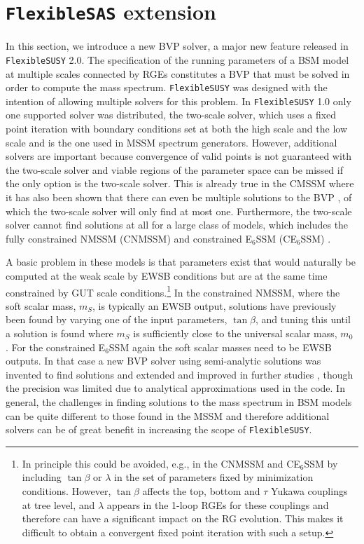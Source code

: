 \documentclass[final,3p,11pt,pdflatex]{elsarticle}
\makeatletter
\newcommand{\fs}{\texttt{FlexibleSUSY}\@\xspace}
\newcommand{\fsone}{\fs 1.0\@\xspace}
\newcommand{\fstwo}{\fs 2.0\@\xspace}
\newcommand{\fsas}{\texttt{FlexibleSAS}\@\xspace}
\newcommand{\ESSM}{E$_6$SSM\@\xspace}
\newcommand{\mzero}{\ensuremath{m_0}\xspace}
\makeatother
\begin{document}
\section{\fsas extension}
\label{sec:fsas}
In this section, we introduce a new BVP
solver, a major new feature released in \fstwo. The specification of the
running parameters of a BSM model at multiple scales connected by RGEs
constitutes a BVP that must be solved in order to compute the mass spectrum.
\fs was designed with the intention of allowing multiple solvers for this
problem. In \fsone only one supported solver was
distributed, the two-scale solver, which uses a fixed point iteration
with boundary conditions set at both the high scale and the low scale
and is the one used in MSSM spectrum generators. However, additional
solvers are important because convergence of valid points is not
guaranteed with the two-scale solver and viable regions of the
parameter space can be missed if the only option is the two-scale
solver.  This is already true in the CMSSM where it has also been
shown that there can even be multiple solutions to the BVP
\cite{Allanach:2013cda,Allanach:2013yua}, of which the two-scale solver will
only find at most one.  Furthermore, the two-scale
solver cannot find solutions at all for a large class of models, which
includes the fully constrained NMSSM (CNMSSM) \cite{Ellwanger:1993xa,
  Ellwanger:1995ru,Ellwanger:1996gw} and constrained \ESSM
(C\ESSM) \cite{Athron:2009bs}.

A basic problem in these models is that parameters exist that would
naturally be computed at the weak scale by EWSB conditions but
are at the same time constrained by GUT scale conditions.\footnote{In
  principle this could be avoided, e.g., in the CNMSSM and C\ESSM by including
  $\tan \beta$ or $\lambda$ in the set of parameters fixed by minimization
  conditions.  However, $\tan\beta$ affects the top, bottom and $\tau$ Yukawa
  couplings at tree level, and $\lambda$ appears in the 1-loop RGEs for these
  couplings and therefore can have a significant impact on the RG evolution.
  This makes it difficult to obtain a convergent fixed point iteration with
  such a setup.} In the constrained NMSSM, where the soft scalar mass,
$m_S$, is typically an EWSB output, solutions have previously been
found by varying one of the input parameters, $\tan \beta$, and tuning
this until a solution is found where $m_S$ is sufficiently close to
the universal scalar mass, $\mzero$ \cite{Djouadi:2008yj,Djouadi:2008uj}.
For the constrained \ESSM again the soft scalar masses need to be EWSB
outputs.  In that case a new BVP solver using semi-analytic solutions
was invented to find solutions \cite{Athron:2009ue,Athron:2009bs} and
extended and improved in further studies
\cite{Athron:2011wu,Athron:2012sq,Athron:2012pw}, though the precision
was limited due to analytical approximations used in the code.  In
general, the challenges in finding solutions to the mass spectrum in
BSM models can be quite different to those found in the MSSM and
therefore additional solvers can be of great benefit in increasing the
scope of \fs.
\end{document}
